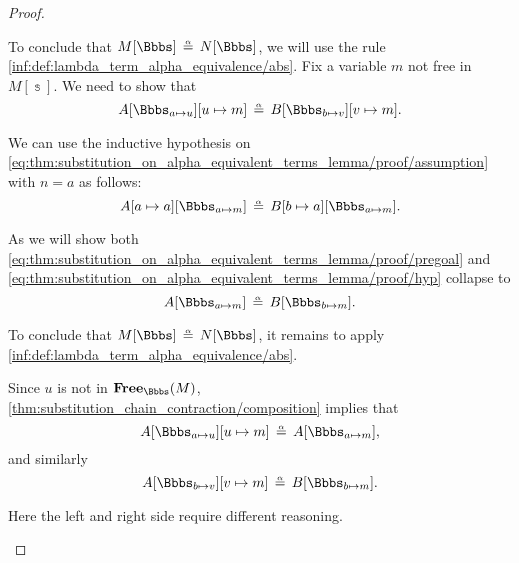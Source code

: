 \begin{proof}
\begin{itemize}
    To conclude that \( M[\Bbbs] \aequiv N[\Bbbs] \), we will use the rule \ref{inf:def:lambda_term_alpha_equivalence/abs}. Fix a variable \( m \) not free in \( M[\Bbbs] \). We need to show that
    \begin{equation}\label{eq:thm:substitution_on_alpha_equivalent_terms_lemma/proof/pregoal}
      A[\Bbbs_{a \mapsto u}][u \mapsto m] \aequiv B[\Bbbs_{b \mapsto v}][v \mapsto m].
    \end{equation}

    We can use the inductive hypothesis on \eqref{eq:thm:substitution_on_alpha_equivalent_terms_lemma/proof/assumption} with \( n = a \) as follows:
    \begin{equation}\label{eq:thm:substitution_on_alpha_equivalent_terms_lemma/proof/hyp}
      A[a \mapsto a][\Bbbs_{a \mapsto m}] \aequiv B[b \mapsto a][\Bbbs_{a \mapsto m}].
    \end{equation}

    As we will show both \eqref{eq:thm:substitution_on_alpha_equivalent_terms_lemma/proof/pregoal} and \eqref{eq:thm:substitution_on_alpha_equivalent_terms_lemma/proof/hyp} collapse to
    \begin{equation}\label{eq:thm:substitution_on_alpha_equivalent_terms_lemma/proof/goal}
      A[\Bbbs_{a \mapsto m}] \aequiv B[\Bbbs_{b \mapsto m}].
    \end{equation}

    To conclude that \( M[\Bbbs] \aequiv N[\Bbbs] \), it remains to apply \ref{inf:def:lambda_term_alpha_equivalence/abs}.

     Since \( u \) is not in \( \op*{Free}_\Bbbs(M) \), \cref{thm:substitution_chain_contraction/composition} implies that
    \begin{equation*}
      A[\Bbbs_{a \mapsto u}][u \mapsto m] \aequiv A[\Bbbs_{a \mapsto m}],
    \end{equation*}
    and similarly
    \begin{equation*}
      A[\Bbbs_{b \mapsto v}][v \mapsto m] \aequiv B[\Bbbs_{b \mapsto m}].
    \end{equation*}

     Here the left and right side require different reasoning.


\end{itemize}
\end{proof}
